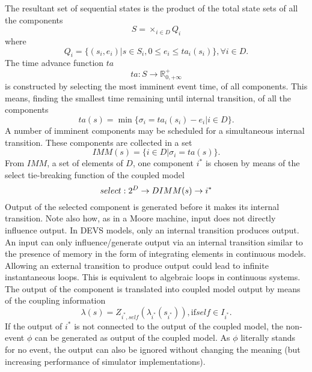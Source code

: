 The resultant set of sequential states is the product of the total state sets of all the components
\begin{equation}
    S = \times_{i \in D} Q_i
\end{equation}
where
\begin{equation}
    Q_i = \{ (s_i, e_i) | s \in S_i, 0 \leq e_i \leq ta_i(s_i) \}, \forall i \in D.
\end{equation}
The time advance function $ta$
\begin{equation}
    ta : S \rightarrow \mathbb{R}^+_{0, + \infty}
\end{equation}
is constructed by selecting the most imminent event time, of all components. This means, finding the smallest time remaining 
until internal transition, of all the components
\begin{equation}
    ta(s) = \min \{\sigma_i = ta_i(s_i) - e_i | i \in D \}.
\end{equation}
A number of imminent components may be scheduled for a simultaneous internal transition. These components are collected in a 
set
\begin{equation}
    IMM(s) = \{i \in D | \sigma_i = ta(s)\}.
\end{equation}
From $IMM$, a set of elements of $D$, one component $i^*$ is chosen by means of the select tie-breaking function of the coupled 
model
\begin{equation}
    select : 2^D \rightarrow D \\
    IMM(s) \rightarrow i^*
\end{equation}
Output of the selected component is generated before it makes its internal transition. Note also how, as in a Moore machine, 
input does not directly influence output. In DEVS models, only an internal transition produces output. An input can only 
influence/generate output via an internal transition similar to the presence of memory in the form of integrating elements in 
continuous models. Allowing an external transition to produce output could lead to infinite instantaneous loops. This is equivalent 
to algebraic loops in continuous systems. The output of the component is translated into coupled model output by means of the 
coupling information
\begin{equation}
    \lambda(s) = Z_{i^*, self} (\lambda_{i^*}(s_{i^*})), \text{if} self \in I_{i^*}.
\end{equation}
If the output of $i^*$ is not connected to the output of the coupled model, the non-event $\phi$ can be generated as output of 
the coupled model. As $\phi$ literally stands for no event, the output can also be ignored without changing the meaning (but 
increasing performance of simulator implementations).


